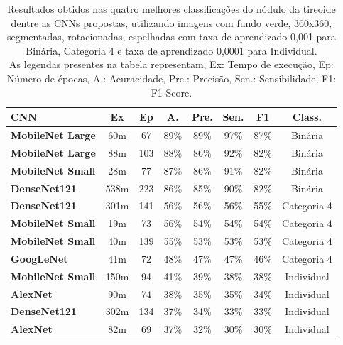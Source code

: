 \documentclass[12pt]{article}
\begin{document}
\begin{table}[H]
\centering
\caption{\textmd{Resultados obtidos nas quatro melhores classificações do nódulo da tireoide dentre as CNNs propostas, utilizando imagens com fundo verde, 360x360, segmentadas, rotacionadas, espelhadas com taxa de aprendizado 0,001 para Binária, Categoria 4 e taxa de aprendizado 0,0001 para Individual.
\\As legendas presentes na tabela representam, Ex: Tempo de execução, Ep: Número de épocas, A.: Acuracidade, Pre.: Precisão, Sen.: Sensibilidade, F1: F1-Score.
}\\}\label{table:binary}
\begin{tabular}{lccccccc}
\toprule
 {CNN} & {Ex} & {Ep} & {A.} & {Pre.} & {Sen.} & {F1} & {Class.} \\
\midrule
\textbf{MobileNet Large} & 60m & 67 & 89\% & 89\% & 97\% & 87\% & Binária \\
\midrule
\textbf{MobileNet Large} & 88m & 103 & 88\% & 86\% & 92\% & 82\% & Binária \\
\midrule
\textbf{MobileNet Small} & 28m & 77 & 87\% & 86\% & 91\% & 82\% & Binária \\
\midrule
\textbf{DenseNet121}     & 538m & 223& 86\% & 85\% & 90\% & 82\% & Binária \\
\midrule
\midrule
\textbf{DenseNet121}     & 301m & 141 & 56\% & 56\% & 56\% & 55\% & Categoria 4 \\
\midrule
\textbf{MobileNet Small} & 19m & 73 & 56\% & 54\% & 54\% & 54\% & Categoria 4 \\
\midrule
\textbf{MobileNet Small} & 40m & 139 & 55\% & 53\% & 53\% & 53\% & Categoria 4 \\
\midrule
\textbf{GoogLeNet}       & 41m & 72 & 48\% & 47\% & 47\% & 46\% & Categoria 4 \\
\midrule
\midrule
\textbf{MobileNet Small} & 150m & 94 & 41\% & 39\% & 38\% & 38\% & Individual \\
\midrule
\textbf{AlexNet}         & 90m & 74 & 38\% & 35\% & 35\% & 34\% & Individual \\
\midrule
\textbf{DenseNet121}     & 302m & 134 & 37\% & 34\% & 33\% & 33\% & Individual \\
\midrule
\textbf{AlexNet}         & 82m & 69 & 37\% & 32\% & 30\% & 30\% & Individual \\
\bottomrule
\end{tabular}
\label{tab:cnn}
\end{table}
\end{document}
